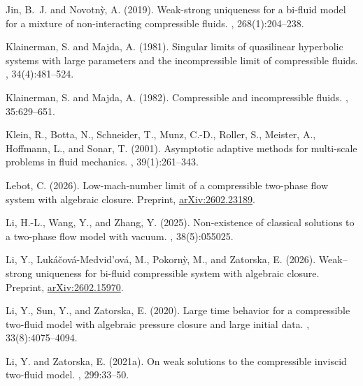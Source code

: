 \documentclass[11pt, twoside, a4paper]{article}
\theoremstyle{plain}
\theoremstyle{remark}
\numberwithin{equation}{section}
\begin{document}
\begin{thebibliography}{}
Jin, B.~J. and Novotn{\`y}, A. (2019).
\newblock Weak-strong uniqueness for a bi-fluid model for a mixture of
  non-interacting compressible fluids.
, 268(1):204--238.

Klainerman, S. and Majda, A. (1981).
\newblock Singular limits of quasilinear hyperbolic systems with large
  parameters and the incompressible limit of compressible fluids.
, 34(4):481--524.

Klainerman, S. and Majda, A. (1982).
\newblock Compressible and incompressible fluids.
, 35:629--651.

Klein, R., Botta, N., Schneider, T., Munz, C.-D., Roller, S., Meister, A.,
  Hoffmann, L., and Sonar, T. (2001).
\newblock Asymptotic adaptive methods for multi-scale problems in fluid
  mechanics.
, 39(1):261--343.

Lebot, C. (2026).
\newblock Low-mach-number limit of a compressible two-phase flow system with
  algebraic closure.
\newblock Preprint, \href{https://arxiv.org/abs/2602.23189}{arXiv:2602.23189}.

Li, H.-L., Wang, Y., and Zhang, Y. (2025).
\newblock Non-existence of classical solutions to a two-phase flow model with
  vacuum.
, 38(5):055025.

Li, Y., Luk{\'a}{\v{c}}ov{\'a}-Medvid'ov{\'a}, M., Pokorn{\`y}, M., and
  Zatorska, E. (2026).
\newblock Weak--strong uniqueness for bi-fluid compressible system with
  algebraic closure.
\newblock Preprint, \href{https://arxiv.org/abs/2602.15970}{arXiv:2602.15970}.

Li, Y., Sun, Y., and Zatorska, E. (2020).
\newblock Large time behavior for a compressible two-fluid model with algebraic
  pressure closure and large initial data.
, 33(8):4075--4094.

Li, Y. and Zatorska, E. (2021a).
\newblock On weak solutions to the compressible inviscid two-fluid model.
, 299:33--50.


\end{thebibliography}
\end{document}
